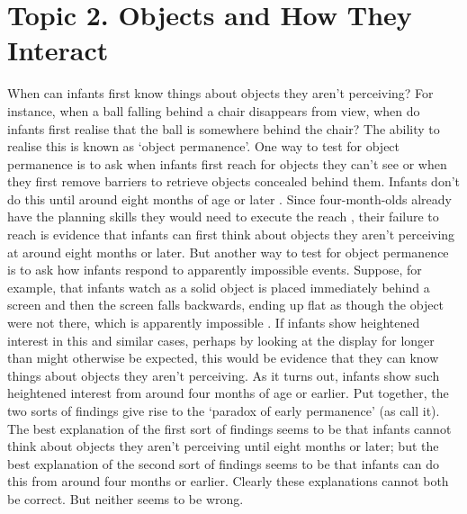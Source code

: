 \documentclass[12pt,\papersize]{extarticle}
\begin{document}
\section{Topic 2. Objects and How They Interact}
\label{ch:objects}
When can infants first know things about objects they aren't perceiving?   
For instance, when a ball falling behind a chair disappears from view, when do infants first realise that the ball is somewhere behind the chair?
The ability to realise this is known as `object permanence'.  
One way to test for object permanence is to ask when infants first reach for objects they can’t see or when they first remove barriers to retrieve objects concealed behind them.  
Infants don’t do this until around eight months of age \citep[p.\ 202]{Meltzoff:1998wp} or  later \citep{moore:2008_factors}.  
Since four-month-olds already have the planning skills they would need to execute the reach \citep{Shinskey:2001fk}, 
their failure to reach is evidence that infants can first think about objects they aren’t perceiving at around eight months or later.  
But another way to test for object permanence is to ask how infants respond to apparently impossible events. 
Suppose, for example, that infants watch as a solid object is placed immediately behind a screen and then the screen falls backwards, ending up flat as though the object were not there, which is apparently impossible \citep{baillargeon:1985_object,baillargeon:1987_object}. 
If infants show heightened interest in this and similar cases, perhaps by looking at the display for longer than might otherwise be expected, this would be evidence that they can know things about objects they aren't perceiving.
 As it turns out, infants show such heightened interest from around four months of age or earlier. 
Put together, the two sorts of findings give rise to the `paradox of early permanence' (as \citealp{Meltzoff:1998wp} call it). 
The best explanation of the first sort of findings seems to be that infants cannot think about objects they aren't perceiving until eight months or later; 
but the best explanation of the second sort of findings seems to be that infants can do this from around four months or earlier. 
Clearly these explanations cannot both be correct. 
But neither seems to be wrong. 
\end{document}
